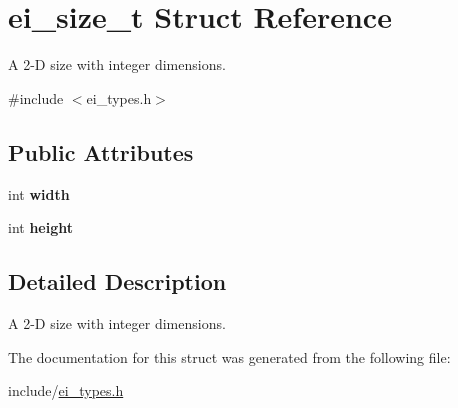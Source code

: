 \hypertarget{structei__size__t}{}\section{ei\+\_\+size\+\_\+t Struct Reference}
\label{structei__size__t}


A 2-\/D size with integer dimensions.  




{\ttfamily \#include $<$ei\+\_\+types.\+h$>$}

\subsection*{Public Attributes}
\begin{DoxyCompactItemize}
\item 
int {\bfseries width}\hypertarget{structei__size__t_a981037618942814a4318a4c27cdaecc1}{}\label{structei__size__t_a981037618942814a4318a4c27cdaecc1}

\item 
int {\bfseries height}\hypertarget{structei__size__t_a2f152e26c90d01cac2b337ebc118a5f1}{}\label{structei__size__t_a2f152e26c90d01cac2b337ebc118a5f1}

\end{DoxyCompactItemize}


\subsection{Detailed Description}
A 2-\/D size with integer dimensions. 

The documentation for this struct was generated from the following file\+:\begin{DoxyCompactItemize}
\item 
include/\hyperlink{ei__types_8h}{ei\+\_\+types.\+h}\end{DoxyCompactItemize}
